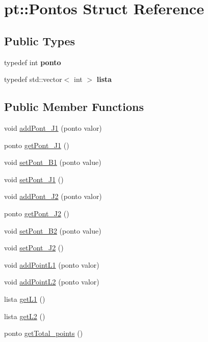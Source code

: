 \hypertarget{structpt_1_1Pontos}{}\section{pt\+:\+:Pontos Struct Reference}
\label{structpt_1_1Pontos}
\subsection*{Public Types}
\begin{DoxyCompactItemize}
\item 
\mbox{\label{structpt_1_1Pontos_a15dce3bf8c3039fa5d14127a07b826c9}} 
typedef int {\bfseries ponto}
\item 
\mbox{\label{structpt_1_1Pontos_ab9e8d2b7c42d0c01a662ed2f103a0dd7}} 
typedef std\+::vector$<$ int $>$ {\bfseries lista}
\end{DoxyCompactItemize}
\subsection*{Public Member Functions}
\begin{DoxyCompactItemize}
\item 
void \hyperlink{structpt_1_1Pontos_a1aa7214c09d37c3e6091d65abf9dd8e2}{add\+Pont\+\_\+\+J1} (ponto valor)
\item 
ponto \hyperlink{structpt_1_1Pontos_aca27962e49470015527855c33c30f610}{get\+Pont\+\_\+\+J1} ()
\item 
void \hyperlink{structpt_1_1Pontos_a46b9cb3a776b33abeb75e9d9d3119609}{set\+Pont\+\_\+\+B1} (ponto value)
\item 
void \hyperlink{structpt_1_1Pontos_ac8acbdd83e34fd0f5f06f865d3a7b636}{set\+Pont\+\_\+\+J1} ()
\item 
void \hyperlink{structpt_1_1Pontos_a49bb0ea578b5fd6ac6204dd87a1dc52b}{add\+Pont\+\_\+\+J2} (ponto valor)
\item 
ponto \hyperlink{structpt_1_1Pontos_a2cdd460251585196e1c151bcb05fbe59}{get\+Pont\+\_\+\+J2} ()
\item 
void \hyperlink{structpt_1_1Pontos_a6bf5a548d754cd90321fd7fdbab5f35c}{set\+Pont\+\_\+\+B2} (ponto value)
\item 
void \hyperlink{structpt_1_1Pontos_abc47bf57aa38fe3b6834bdc2ed068fe4}{set\+Pont\+\_\+\+J2} ()
\item 
void \hyperlink{structpt_1_1Pontos_a13e9f6685a883eabdb05e532e5bd632f}{add\+Point\+L1} (ponto valor)
\item 
void \hyperlink{structpt_1_1Pontos_af20c5c6ab9387cbb281e60e88464ea87}{add\+Point\+L2} (ponto valor)
\item 
lista \hyperlink{structpt_1_1Pontos_a284d70287fc19c3f896af99390c59f85}{get\+L1} ()
\item 
lista \hyperlink{structpt_1_1Pontos_a5e8742cc6ba9a50ab35118e6a0f435d5}{get\+L2} ()
\item 
ponto \hyperlink{structpt_1_1Pontos_adb5354ee1ca6f4a0196c3afa401b50d7}{get\+Total\+\_\+points} ()
\end{DoxyCompactItemize}
